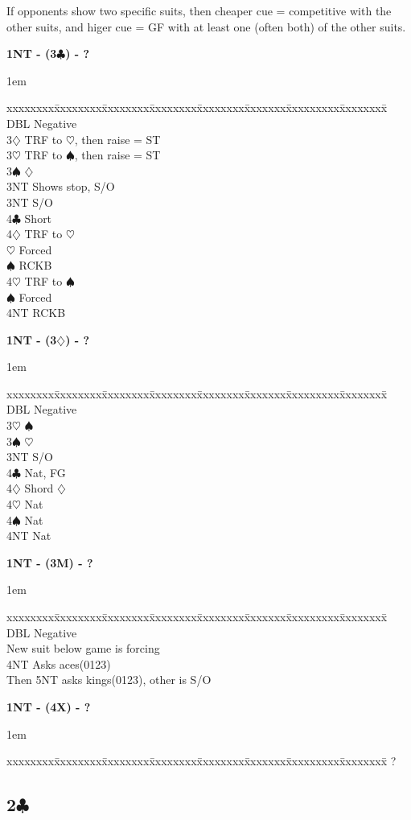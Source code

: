 \documentclass[10pt]{article}
\renewcommand{\c}{$\clubsuit$}
\renewcommand{\d}{$\diamondsuit$}
\newcommand{\h}{$\heartsuit$}
\newcommand{\s}{$\spadesuit$}
\newcommand{\x}{DBL}
\newenvironment{bidtable}[1][]
{\textbf{#1}
  \begin{adjustwidth}{1em}{}
    \addvspace{2pt}
    \begin{tabbing}
      xxxxxxxx\=xxxxxxxx\=xxxxxxxx\=xxxxxxxx\=xxxxxxxx\=xxxxxxx\=xxxxxxxxx\=xxxxxxxx\=\kill}
{\end{tabbing}\end{adjustwidth}\bigskip}%
\newcommand{\pdfc}{\texorpdfstring{\c{}}{C}}
\begin{document}
If opponents show two specific suits, then cheaper cue = competitive with the other suits, and higer cue = GF with at least one (often both) of the other suits.

\begin{bidtable}[1NT - (3\c) - ?]
\x  \> Negative                   \\
3\d \> TRF to \h, then raise = ST \\
3\h \> TRF to \s, then raise = ST \\
3\s \> \d                         \\
    \> 3NT \> Shows stop, S/O     \\
3NT \> S/O                        \\
4\c \> Short                      \\
4\d \> TRF to \h                  \\
    \h \> Forced              \\
    \>     \s \> RCKB         \\
4\h \> TRF to \s                  \\
    \s \> Forced              \\
    \>     \> 4NT \> RCKB
\end{bidtable}

\begin{bidtable}[1NT - (3\d) - ?]
\x  \> Negative \\
3\h \> \s       \\
3\s \> \h       \\
3NT \> S/O      \\
4\c \> Nat, FG  \\
4\d \> Shord \d \\
4\h \> Nat      \\
4\s \> Nat      \\
4NT \> Nat      \\
\end{bidtable}

\begin{bidtable}[1NT - (3M) - ?]
\x  \> Negative                \\
New suit below game is forcing \\
4NT \> Asks aces(0123)         \\
    \> Then 5NT asks kings(0123), other is S/O
\end{bidtable}

\begin{bidtable}[1NT - (4X) - ?]
?
\end{bidtable}
\subsection{2\pdfc}
\end{document}
